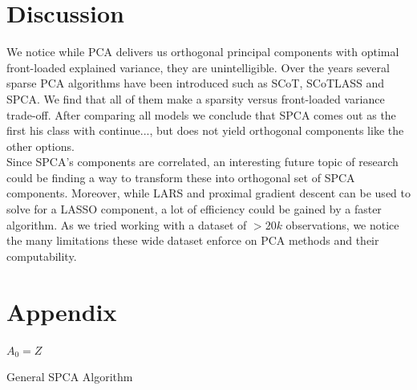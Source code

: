 \documentclass[11pt,letterpaper]{report}
\begin{document}
\section*{Discussion}
We notice while PCA delivers us orthogonal principal components with optimal front-loaded explained variance, they are unintelligible. Over the years several sparse PCA algorithms have been introduced such as SCoT, SCoTLASS and SPCA. We find that all of them make a sparsity versus front-loaded variance trade-off. After comparing all models we conclude that SPCA comes out as the first his class with {\color{red} continue...}, but does not yield orthogonal components like the other options.\\

Since SPCA's components are correlated, an interesting future topic of research could be finding a way to transform these into orthogonal set of SPCA components. Moreover, while LARS and proximal gradient descent can be used to solve for a LASSO component, a lot of efficiency could be gained by a faster algorithm. As we tried working with a dataset of $>20k$ observations, we notice the many limitations these wide dataset enforce on PCA methods and their computability.

%
%


\pagebreak



\pagebreak
\appendix
\section*{Appendix}

\begin{algorithm}[H]
\SetAlgoLined
{}
$A_0 = Z$\;
\caption{General SPCA Algorithm}
\label{algo1:SPCA}
\end{algorithm}
\end{document}
